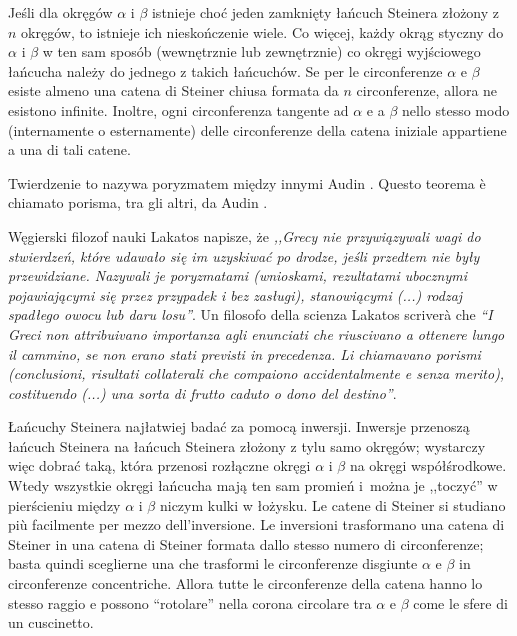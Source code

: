 \begin{theorem} %
\begin{theorem} %
    Jeśli dla okręgów $\alpha$ i $\beta$ istnieje choć jeden zamknięty łańcuch Steinera złożony z $n$ okręgów, to istnieje ich nieskończenie wiele. %
    Co więcej, każdy okrąg styczny do $\alpha$ i $\beta$ w ten sam sposób (wewnętrznie lub zewnętrznie) co okręgi wyjściowego łańcucha należy do jednego z takich łańcuchów. %
    Se per le circonferenze $\alpha$ e $\beta$ esiste almeno una catena di Steiner chiusa formata da $n$ circonferenze, allora ne esistono infinite. %
    Inoltre, ogni circonferenza tangente ad $\alpha$ e a $\beta$ nello stesso modo (internamente o esternamente) delle circonferenze della catena iniziale appartiene a una di tali catene. %
\end{theorem}

Twierdzenie to nazywa poryzmatem między innymi Audin \cite[s. 109]{audin_2003}. %
Questo teorema è chiamato porisma, tra gli altri, da Audin \cite[p. 109]{audin_2003}. %
%

Węgierski filozof nauki Lakatos napisze, że \emph{,,Grecy nie przywiązywali wagi do stwierdzeń, które udawało się im uzyskiwać po drodze, jeśli przedtem nie były przewidziane. %
Nazywali je poryzmatami (wnioskami, rezultatami ubocznymi pojawiającymi się przez przypadek i bez zasługi), stanowiącymi (...) rodzaj spadłego owocu lub daru losu''}. %
Un filosofo della scienza Lakatos scriverà che \emph{``I Greci non attribuivano importanza agli enunciati che riuscivano a ottenere lungo il cammino, se non erano stati previsti in precedenza. %
Li chiamavano porismi (conclusioni, risultati collaterali che compaiono accidentalmente e senza merito), costituendo (...) una sorta di frutto caduto o dono del destino''}. %
%

Łańcuchy Steinera najłatwiej badać za pomocą inwersji. %
Inwersje przenoszą łańcuch Steinera na łańcuch Steinera złożony z tylu samo okręgów; wystarczy więc dobrać taką, która przenosi rozłączne okręgi $\alpha$ i $\beta$ na okręgi współśrodkowe. %
Wtedy wszystkie okręgi łańcucha mają ten sam promień i~można je ,,toczyć'' w pierścieniu między $\alpha$ i $\beta$ niczym kulki w łożysku. %
Le catene di Steiner si studiano più facilmente per mezzo dell'inversione. %
Le inversioni trasformano una catena di Steiner in una catena di Steiner formata dallo stesso numero di circonferenze; basta quindi sceglierne una che trasformi le circonferenze disgiunte $\alpha$ e $\beta$ in circonferenze concentriche. %
Allora tutte le circonferenze della catena hanno lo stesso raggio e possono ``rotolare'' nella corona circolare tra $\alpha$ e $\beta$ come le sfere di un cuscinetto. %


\end{theorem}
